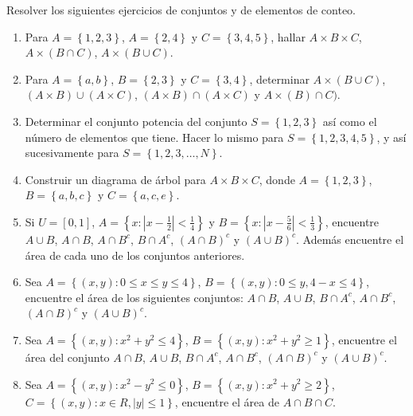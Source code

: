 \begin{Ejer} Resolver los siguientes ejercicios de conjuntos y de elementos de conteo.
\begin{enumerate}

\item Para $A=\left\{1,2,3\right\}$, $A=\left\{2,4\right\}$ y $C=\left\{3,4,5\right\}$, hallar $A\times B\times C$, $A\times (B\cap C)$, $A\times (B\cup C)$.


\item Para $A=\left\{a,b\right\}$, $B=\left\{2,3\right\}$ y $C=\left\{3,4\right\}$, determinar $A\times (B\cup C)$, $(A\times B)\cup (A\times C)$, $(A\times B)\cap (A\times C)$ y $A\times (B)\cap C)$.

\item Determinar el conjunto potencia del conjunto $S=\left\{1,2,3\right\}$ as\'i como el n\'umero de elementos que tiene. Hacer lo mismo para $S=\left\{1,2,3,4,5\right\}$, y as\'i sucesivamente para $S=\left\{1,2,3,\ldots, N\right\}$.

\item Construir un diagrama de \'arbol para $A\times B\times C$, donde $A=\left\{1,2,3\right\}$,  $B=\left\{a,b,c\right\}$ y $C=\left\{a,c,e\right\}$.


\item Si $U=\left[0,1\right]$, $A=\left\{x:|x-\frac{1}{2}|<\frac{1}{4}\right\}$ y $B=\left\{x:|x-\frac{5}{6}|<\frac{1}{3}\right\}$, encuentre $A\cup B$, $A\cap B$, $A\cap B^{c}$, $B\cap A^{c}$, $\left(A\cap B\right)^{c}$ y $\left(A\cup B\right)^{c}$. Adem\'as encuentre el \'area de cada uno de los conjuntos anteriores.


\item Sea $A=\left\{\left(x,y\right):0\leq x\leq y\leq4\right\}$, $B=\left\{\left(x,y\right):0\leq y, 4-x\leq4\right\}$, encuentre el \'area de los siguientes conjuntos: $A\cap B$, $A\cup B$, $B\cap A^{c}$, $A\cap B^{c}$, $\left(A\cap B\right)^{c}$ y $\left(A\cup B\right)^{c}$.


\item Sea $A=\left\{\left(x,y\right): x^2+y^2\leq4\right\}$, $B=\left\{\left(x,y\right): x^2+y^2\geq1\right\}$, encuentre el \'area del conjunto $A\cap B$, $A\cup B$, $B\cap A^{c}$, $A\cap B^{c}$, $\left(A\cap B\right)^{c}$ y $\left(A\cup B\right)^{c}$.

\item Sea $A=\left\{\left(x,y\right): x^2-y^2\leq0\right\}$, $B=\left\{\left(x,y\right): x^2+y^2\geq2\right\}$,  $C=\left\{\left(x,y\right):x\in R, |y|\leq1\right\}$, encuentre el \'area de $A\cap B\cap C$.


\end{enumerate}
\end{Ejer}
